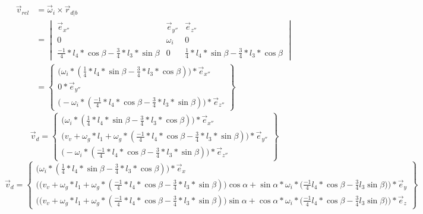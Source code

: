 \documentclass[a4paper,10pt]{article}
\begin{document}
\begin{equation}
\begin{aligned}
\vec{v}_{rel} &= \vec{\omega}_i \times \vec{r}_{d|b} \\
&=\begin{vmatrix}
\vec{e}_{x''} & \vec{e}_{y''} & \vec{e}_{z''}\\
0 & \omega_i & 0 \\
\frac{-1}{4}*l_4*\cos{\beta} - \frac{3}{4}*l_3 * \sin{\beta} & 0 &\frac{1}{4}*l_4 *\sin{\beta}-\frac{3}{4}*l_3 * \cos{\beta}
\end{vmatrix}\\
&= \begin{Bmatrix}
\Big(\omega_i * (\frac{1}{4}*l_4 *\sin{\beta}-\frac{3}{4}*l_3 * \cos{\beta})\Big) * \vec{e}_{x''}\\
0 *\vec{e}_{y''}\\
\Big(-\omega_i *(\frac{-1}{4}*l_4*\cos{\beta} - \frac{3}{4}*l_3 * \sin{\beta}) \Big)*\vec{e}_{z''}
\end{Bmatrix}
\end{aligned}
\end{equation}
\begin{equation}
\vec{v}_d = \begin{Bmatrix}
\Big(\omega_i * (\frac{1}{4}*l_4 *\sin{\beta}-\frac{3}{4}*l_3 * \cos{\beta})\Big) * \vec{e}_{x''}\\
\Big(v_v + \omega_g * l_1 + \omega_g*(\frac{-1}{4}*l_4*\cos{\beta}-\frac{3}{4}*l_3*\sin{\beta}) \Big) *\vec{e}_{y''}\\
\Big(-\omega_i *(\frac{-1}{4}*l_4*\cos{\beta} - \frac{3}{4}*l_3 * \sin{\beta}) \Big)*\vec{e}_{z''}
\end{Bmatrix}
\end{equation}
\begin{equation}
\vec{v}_d = \begin{Bmatrix}
\Big(\omega_i * (\frac{1}{4}*l_4 *\sin{\beta}-\frac{3}{4}*l_3 * \cos{\beta})\Big) * \vec{e}_{x}\\
\Big(\big(v_v + \omega_g * l_1 + \omega_g*(\frac{-1}{4}*l_4*\cos{\beta}-\frac{3}{4}*l_3*\sin{\beta}) \big) \cos{\alpha}  + \sin{\alpha} * \omega_i * \big( \frac{-1}{4}l_4*\cos{\beta} - \frac{3}{4}l_3 \sin{\beta}\big)\Big)*\vec{e}_{y} \\
\Big(\big(v_v + \omega_g * l_1 + \omega_g*(\frac{-1}{4}*l_4*\cos{\beta}-\frac{3}{4}*l_3*\sin{\beta}) \big) \sin{\alpha}  + \cos{\alpha} * \omega_i * \big( \frac{-1}{4}l_4*\cos{\beta} - \frac{3}{4}l_3 \sin{\beta}\big)\Big)*\vec{e}_{z}
\end{Bmatrix}
\end{equation}
\end{document}

